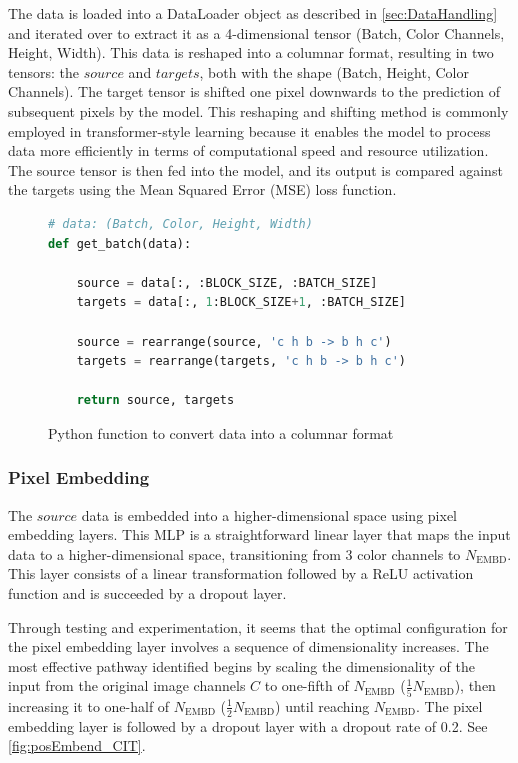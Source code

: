     The data is loaded into a DataLoader object as described in \autoref{sec:DataHandling} and iterated over to extract it as a 4-dimensional tensor (Batch, Color Channels, Height, Width). This data is reshaped into a columnar format, resulting in two tensors: the \(source\) and \(targets\), both with the shape (Batch, Height, Color Channels). The target tensor is shifted one pixel downwards to the prediction of subsequent pixels by the model. This reshaping and shifting method is commonly employed in transformer-style learning because it enables the model to process data more efficiently in terms of computational speed and resource utilization. The source tensor is then fed into the model, and its output is compared against the targets using the Mean Squared Error (MSE) loss function.

\begin{figure}[H]
\centering
\begin{lstlisting}[language=Python]
# data: (Batch, Color, Height, Width)
def get_batch(data):

    source = data[:, :BLOCK_SIZE, :BATCH_SIZE]
    targets = data[:, 1:BLOCK_SIZE+1, :BATCH_SIZE]

    source = rearrange(source, 'c h b -> b h c')
    targets = rearrange(targets, 'c h b -> b h c')

    return source, targets
\end{lstlisting}
\caption{Python function to convert data into a columnar format}
\label{fig:get_batch_CIT}
\end{figure}

    \subsubsection{Pixel Embedding}

    The \(source\) data is embedded into a higher-dimensional space using pixel embedding layers. This MLP is a straightforward linear layer that maps the input data to a higher-dimensional space, transitioning from \(3\) color channels to \(N_{\text{EMBD}}\). This layer consists of a linear transformation followed by a ReLU activation function and is succeeded by a dropout layer.

    Through testing and experimentation, it seems that the optimal configuration for the pixel embedding layer involves a sequence of dimensionality increases. The most effective pathway identified begins by scaling the dimensionality of the input from the original image channels \(C\) to one-fifth of \(N_{\text{EMBD}}\) (\(\frac{1}{5}N_{\text{EMBD}}\)), then increasing it to one-half of \(N_{\text{EMBD}}\) (\(\frac{1}{2}N_{\text{EMBD}}\)) until reaching \(N_{\text{EMBD}}\). The pixel embedding layer is followed by a dropout layer with a dropout rate of 0.2. See \autoref{fig:posEmbend_CIT}.

